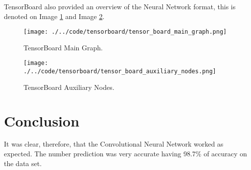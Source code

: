 \documentclass[journal]{IEEEtran}
\begin{document}
TensorBoard also provided an overview of the Neural Network format, this is denoted on Image \ref{img:tensorboard_main} and Image \ref{img:tensorboard_aux}.

\begin{figure}
  \begin{center}
  \texttt{[image: ./../code/tensorboard/tensor\_board\_main\_graph.png]}
  \caption{TensorBoard Main Graph.}
  \label{img:tensorboard_main}
  \end{center}
\end{figure}

\begin{figure}
  \begin{center}
  \texttt{[image: ./../code/tensorboard/tensor\_board\_auxiliary\_nodes.png]}
  \caption{TensorBoard Auxiliary Nodes.}
  \label{img:tensorboard_aux}
  \end{center}
\end{figure}

\section {Conclusion}

It was clear, therefore, that the Convolutional Neural Network worked as expected. The number prediction was very accurate having 98.7\% of accuracy on the data set.

\vfill
\end{document}
